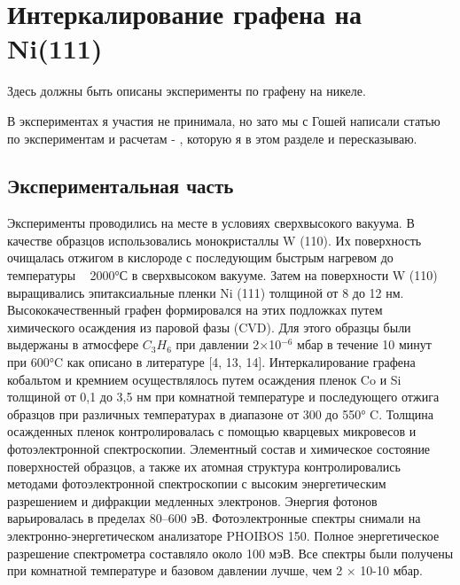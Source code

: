 
\chapter{Интеркалирование графена на Ni(111)}\label{ch:ch1}
Здесь должны быть описаны эксперименты по графену на никеле.

В экспериментах я участия не принимала, но зато мы с Гошей написали статью по экспериментам и расчетам - \cite{grebenyuk2019840}, которую я в этом разделе и пересказываю.
\section{Экспериментальная часть}\label{sec:ch1/sec1}


Эксперименты проводились на месте в условиях сверхвысокого вакуума. В качестве образцов использовались монокристаллы W (110). Их поверхность очищалась отжигом в кислороде с последующим быстрым нагревом до температуры ~ 2000°С в сверхвысоком вакууме. Затем на поверхности W (110)  выращивались эпитаксиальные пленки Ni (111) толщиной от 8 до 12 нм. Высококачественный графен формировался на этих подложках путем химического осаждения из паровой фазы (CVD). Для этого образцы были выдержаны в атмосфере $C_3H_6$ при давлении 2×10$^{-6}$ мбар в течение 10 минут при 600°C как описано в литературе [4, 13, 14]. Интеркалирование графена кобальтом и кремнием осуществлялось путем осаждения пленок Co и Si толщиной от 0,1 до 3,5 нм при комнатной температуре и последующего отжига образцов при различных температурах в диапазоне от 300 до 550° C. Толщина осажденных пленок контролировалась с помощью кварцевых микровесов и фотоэлектронной спектроскопии. 
Элементный состав и химическое состояние поверхностей образцов, а также их атомная структура контролировались методами фотоэлектронной спектроскопии с высоким энергетическим разрешением и дифракции медленных электронов. Энергия фотонов варьировалась в пределах 80–600 эВ. Фотоэлектронные спектры снимали на электронно-энергетическом анализаторе PHOIBOS 150. Полное энергетическое разрешение спектрометра составляло около 100 мэВ. Все спектры были получены при комнатной температуре и базовом давлении лучше, чем 2 × 10-10 мбар. 

